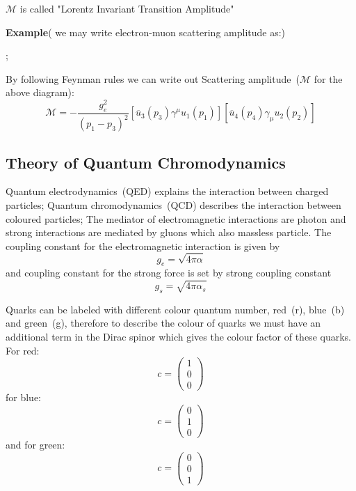 $\mathcal{M}$ is called "Lorentz Invariant Transition Amplitude"

\textbf{Example}( we may write electron-muon scattering amplitude as:)\\
\begin{center}
;
\end{center}

By following Feynman rules we can write out Scattering amplitude~($\mathcal{M}$ for the above diagram):
\begin{equation}
\mathcal{M}=-\frac{g_{e}^{2}}{(p_{1}-p_{3})^{2}}[\overline{u}_{3}(p_{3})\gamma^{\mu}u_{1}(p_{1})][\overline{u}_{4}(p_{4})\gamma_{\mu}u_{2}(p_{2})]
\end{equation}
\subsection{Theory of Quantum Chromodynamics}
Quantum electrodynamics~(QED) explains the interaction between charged particles; Quantum chromodynamics~(QCD) describes the interaction between coloured particles; The mediator of electromagnetic interactions are photon and strong interactions are mediated by gluons which also massless particle. The coupling constant for the electromagnetic interaction is given by
\begin{equation}
g_{e}=\sqrt{4\pi\alpha}
\end{equation}
and coupling constant for the strong force is set by strong coupling constant
\begin{equation}
g_{s}=\sqrt{4\pi\alpha_{s}}
\end{equation}

Quarks can be labeled with different colour quantum number, red~(r), blue~(b) and green~(g), therefore to describe the colour of quarks we must have an additional term in the Dirac spinor which gives the colour factor of these quarks.
For red:
\begin{equation}
c=\begin{pmatrix}
1\\
0\\
0
\end{pmatrix}
\end{equation}
for blue:
\begin{equation}
c=\begin{pmatrix}
0\\
1\\
0
\end{pmatrix}
\end{equation}
and for green:
\begin{equation}
c=\begin{pmatrix}
0\\
0\\
1
\end{pmatrix}
\end{equation}

